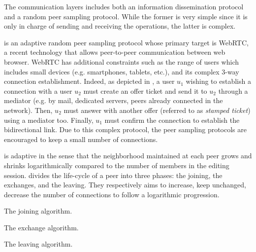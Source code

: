 \begin{asparadesc}
\item [The communication layers] includes both an information dissemination
  protocol and a random peer sampling protocol. While the former is very simple
  since it is only in charge of sending and receiving the operations, the latter
  is complex.

  \SPRAY is an adaptive random peer sampling protocol whose primary target is
  WebRTC, a recent technology that allows peer-to-peer communication between web
  browser. WebRTC has additional constraints such as the range of users which
  includes small devices (e.g. smartphones, tablets, etc.), and its complex
  3-way connection establishment. Indeed, as depicted in , a user
  $u_1$ wishing to establish a connection with a user $u_2$ must create an offer
  ticket and send it to $u_2$ through a mediator (e.g. by mail, dedicated
  servers, peers already connected in the network). Then, $u_2$ must answer with
  another offer (referred to as \emph{stamped ticket}) using a mediator
  too. Finally, $u_1$ must confirm the connection to establish the bidirectional
  link. Due to this complex protocol, the peer sampling protocols are encouraged
  to keep a small number of connections.

  \SPRAY is adaptive in the sense that the neighborhood maintained at each peer
  grows and shrinks logarithmically compared to the number of members in the
  editing session. \SPRAY divides the life-cycle of a peer into three phases:
  the joining, the exchanges, and the leaving. They respectively aims to
  increase, keep unchanged, decrease the number of connections to follow a
  logarithmic progression.
  
  \begin{algorithm}
    
    \caption{\label{algo:joining}The joining algorithm.}
  \end{algorithm}
  
  \begin{algorithm}
    
    \caption{\label{algo:exchange}The exchange algorithm.}
  \end{algorithm}
  
  \begin{algorithm}
    
    \caption{\label{algo:leaving}The leaving algorithm.}
  \end{algorithm}
\end{asparadesc}



